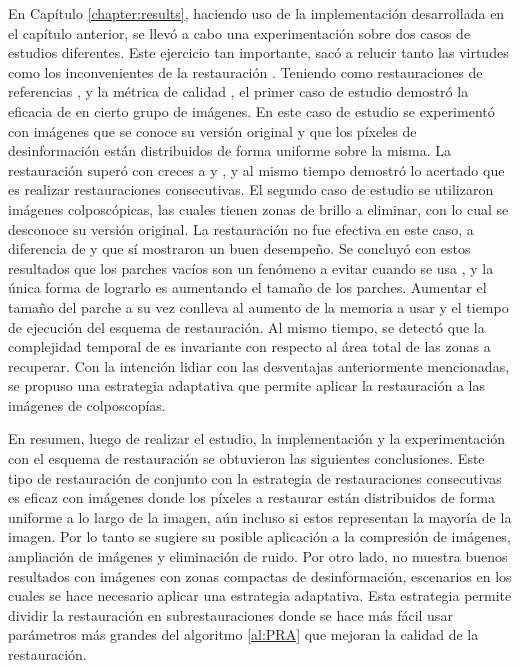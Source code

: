 \begin{conclusions}
En Cap\'itulo \ref{chapter:results}, haciendo uso de la implementaci\'on desarrollada en el cap\'itulo anterior, se llev\'o a cabo una experimentaci\'on sobre dos casos de estudios diferentes. Este ejercicio tan importante, sac\'o a relucir tanto las virtudes como los inconvenientes de la restauraci\'on \SOP. Teniendo como restauraciones de referencias \TELEA, \NS y la m\'etrica de calidad \PSNR, el primer caso de estudio demostr\'o la eficacia de \SOP en cierto grupo de im\'agenes. En este caso de estudio se experiment\'o con im\'agenes que se conoce su versión original y que los p\'ixeles de desinformaci\'on est\'an distribuidos de forma uniforme sobre la misma. La restauraci\'on \SOP super\'o con creces a \TELEA y \NS, y al mismo tiempo demostr\'o lo acertado que es realizar restauraciones consecutivas. El segundo caso de estudio se utilizaron im\'agenes colposc\'opicas, las cuales tienen zonas de brillo a eliminar, con lo cual se desconoce su versi\'on original. La restauraci\'on \SOP no fue efectiva en este caso, a diferencia de \TELEA y \NS que s\'i mostraron un buen desempeño. Se concluy\'o con estos resultados que los parches vac\'ios son un fen\'omeno a evitar cuando se usa \SOP, y la \'unica forma de lograrlo es aumentando el tamaño de los parches. Aumentar el tamaño del parche a su vez conlleva al aumento de la memoria a usar y el tiempo de ejecuci\'on del esquema de restauraci\'on. Al mismo tiempo, se detect\'o que la complejidad temporal de \SOP es invariante con respecto al \'area total de las zonas a recuperar. Con la intenci\'on lidiar con las desventajas anteriormente mencionadas, se propuso una estrategia adaptativa que permite aplicar la restauraci\'on \SOP a las im\'agenes de colposcop\'ias.

En resumen, luego de realizar el estudio, la implementaci\'on y la experimentación con el esquema de restauraci\'on \SOP se obtuvieron las siguientes conclusiones. Este tipo de restauraci\'on de conjunto con la estrategia de restauraciones consecutivas es eficaz con im\'agenes donde los p\'ixeles a restaurar est\'an distribuidos de forma uniforme a lo largo de la imagen, a\'un incluso si estos representan la mayor\'ia de la imagen. Por lo tanto se sugiere su posible aplicaci\'on a la compresi\'on de im\'agenes, ampliaci\'on de im\'agenes y eliminaci\'on de ruido. Por otro lado, \SOP no muestra buenos resultados con im\'agenes con zonas compactas de desinformaci\'on, escenarios en los cuales se hace necesario aplicar una estrategia adaptativa. Esta estrategia permite dividir la restauraci\'on en subrestauraciones donde se hace m\'as f\'acil usar par\'ametros m\'as grandes del algoritmo \ref{al:PRA} que mejoran la calidad de la restauraci\'on.


\end{conclusions}
